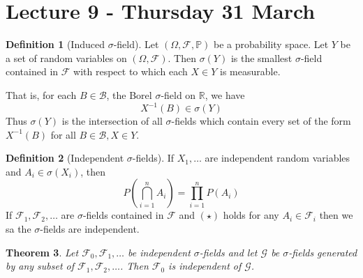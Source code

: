 \documentclass[10pt, oneside, reqno]{amsart}
\theoremstyle{plain}%
\newtheorem{thm}{Theorem}[section]
\theoremstyle{definition}
\newtheorem{defn}[thm]{Definition}
\theoremstyle{remark}
\newcommand{\sigf}{\mathcal{F}}
\newcommand{\R}{\mathbb{R}}
\renewcommand{\P}{\mathbb{P}}
\begin{document}
\section{Lecture 9 - Thursday 31 March} %
\label{sec:lecture_9_thursdy_31_march}
\begin{defn}[Induced $\sigma$-field]
    Let $(\Omega, \sigf, \P)$ be a probability space.  Let $Y$ be a set of random variables on $(\Omega, \sigf)$.  Then $\sigma(Y)$ is the smallest $\sigma$-field contained in $\sigf$ with respect to which each $X \in Y$ is measurable.  
    
    That is, for each $B \in \mathcal{B}$, the Borel $\sigma$-field on $\R$, we have \[
        X^{-1}(B) \in \sigma(Y)
    \]  Thus $\sigma(Y)$ is the intersection of all $\sigma$-fields which contain every set of the form $X^{-1}(B)$ for all $B \in \mathcal{B}, X \in Y$.  
\end{defn}

\begin{defn}[Independent $\sigma$-fields]
    If $X_1, \dots$ are independent random variables and $A_i \in \sigma(X_i)$, then \[
        P(\bigcap_{i=1}^n A_i) = \prod_{i=1}^n P(A_i) \tag{$\star$}
    \]
    If $\sigf_1, \sigf_2, \dots$ are $\sigma$-fields contained in $\sigf$ and $(\star)$ holds for any $A_i \in \sigf_i$ then we sa the $\sigma$-fields are independent. 
\end{defn}

\begin{thm}
    Let $\sigf_0, \sigf_1, \dots$ be independent $\sigma$-fields and let $\mathcal{G}$ be $\sigma$-fields generated by any subset of $\sigf_1, \sigf_2, \dots$.  Then $\sigf_0$ is independent of $\mathcal{G}$.  
\end{thm}
\end{document}

